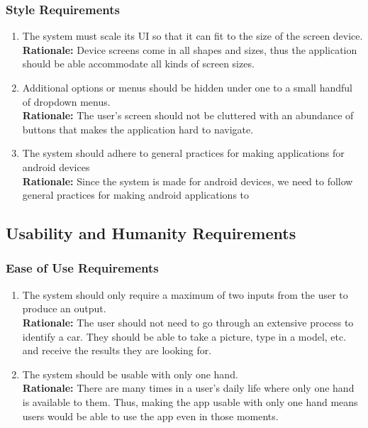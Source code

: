 \documentclass[]{article}
\begin{document}
\subsubsection{Style Requirements}
\label{ssub:style_requirements}
\begin{enumerate}[{LF-S}1. ]
	\item The system must scale its UI so that it can fit to the size of the screen device.\\
	\textbf{Rationale:} Device screens come in all shapes and sizes, thus the application should be able accommodate all kinds of screen sizes.
	\item Additional options or menus should be hidden under one to a small handful of dropdown menus.\\
	\textbf{Rationale:} The user's screen should not be cluttered with an abundance of buttons that makes the application hard to navigate.
	\item The system should adhere to general practices for making applications for android devices\\
	\textbf{Rationale:} Since the system is made for android devices, we need to follow general practices for making android applications to 

\end{enumerate}


\subsection{Usability and Humanity Requirements}
\label{sub:usability_and_humanity_requirements}

\subsubsection{Ease of Use Requirements}
\label{ssub:ease_of_use_requirements}
\begin{enumerate}[{UH-EOU}1. ]
	\item The system should only require a maximum of two inputs from the user to produce an output.\\
	\textbf{Rationale:} The user should not need to go through an extensive process to identify a car. They should be able to take a picture, type in a model, etc. and receive the results they are looking for.
	\item The system should be usable with only one hand.\\
	\textbf{Rationale:} There are many times in a user's daily life where only one hand is available to them. Thus, making the app usable with only one hand means users would be able to use the app even in those moments.
\end{enumerate}
\end{document}
